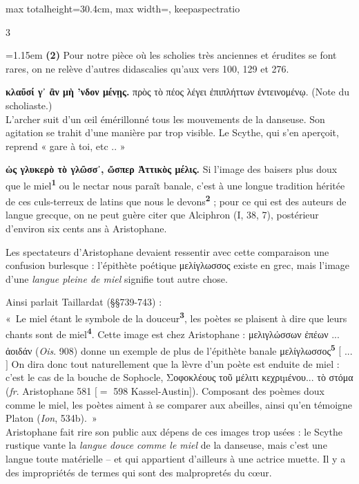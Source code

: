 \documentclass[11pt,twoside]{book}
\newcommand{\italique}[1]{\textit{#1}}
\newcommand{\marqueur}[1]{\textsuperscript{\color{rubricRed}\textbf{#1}}}
\begin{document}
\begin{adjustbox}{max totalheight=30.4cm, max width=\textwidth, keepaspectratio}
\begin{minipage}{\textwidth}
{\begin{multicols}{3}
\par\vspace{1.5pt}
\noindent\hangindent=1.15em {\color{sepiaNote}\textbf{(2)}} Pour notre pièce où les scholies très anciennes et érudites se font rares, on ne relève d'autres didascalies qu'aux vers 100, 129 et 276.
\par\vspace{1.5pt}
 \textbf{κλαῦσί γ᾽ ἂν μὴ 'νδον μένῃς.} πρὸς τὸ πέος λέγει ἐπιπλήττων ἐντεινομένῳ. (Note du scholiaste.)\\ L'archer suit d'un œil émérillonné tous les mouvements de la danseuse. Son agitation se trahit d'une manière par trop visible. Le Scythe, qui s'en aperçoit, reprend « gare à toi, etc .. »
\par\vspace{1.5pt}
 \textbf{ὠς γλυκερὸ τὸ γλῶσσ᾽, ὤσπερ Ἀττικὸς μέλις.} Si l'image des baisers plus doux que le miel\marqueur{1} ou le nectar nous paraît banale, c'est à une longue tradition héritée de ces culs-terreux de latins que nous le devons\marqueur{2} ; pour ce qui est des auteurs de langue grecque, on ne peut guère citer que Alciphron (I, 38, 7), postérieur d'environ six cents ans à Aristophane.
\par\vspace{1.5pt}
\noindent Les spectateurs d'Aristophane devaient ressentir avec cette comparaison une confusion burlesque : l'épithète poétique μελίγλωσσος existe en grec, mais l'image d'une \italique{langue pleine de miel} signifie tout autre chose.
\par\vspace{1.5pt}
\noindent Ainsi parlait Taillardat (§§739-743) :\\ «~Le miel étant le symbole de la douceur\marqueur{3}, les poètes se plaisent à dire que leurs chants sont de miel\marqueur{4}. Cette image est chez Aristophane : μελιγλώσσων ἐπέων ... ἀοιδάν (\italique{Ois}. 908) donne un exemple de plus de l'épithète banale μελίγλωσσος\marqueur{5} $[$ ... $]$ On dira donc tout naturellement que la lèvre d'un poète est enduite de miel : c'est le cas de la bouche de Sophocle, Σοφοκλέους τοῦ μέλιτι κεχριµένου... τὸ στόμα (\italique{fr}. Aristophane 581 $[=$ 598 Kassel-Austin$]$). Composant des poèmes doux comme le miel, les poètes aiment à se comparer aux abeilles, ainsi qu'en témoigne Platon (\italique{Ion}, 534b).~»\\ Aristophane fait rire son public aux dépens de ces images trop usées : le Scythe rustique vante la \italique{langue douce comme le miel} de la danseuse, mais c'est une langue toute matérielle -- et qui appartient d'ailleurs à une actrice muette. Il y a des impropriétés de termes qui sont des malpropretés du cœur.

\end{multicols}}
\end{minipage}
\end{adjustbox}
\end{document}
